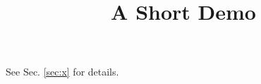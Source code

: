 \documentclass[article]{jss}
\title{A Short Demo}
\begin{document}
See Sec. \ref{sec:x} for details.
\end{document}
